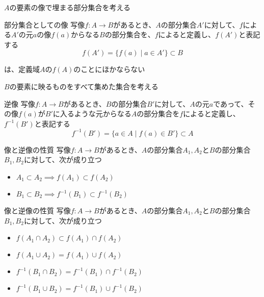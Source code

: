 \documentclass[../../../topic_mapping]{subfiles}
\begin{document}
\sectionline
{}

$A$の要素の像で埋まる部分集合を考える

\begin{definition}{部分集合としての像}
  写像$f\colon A \to B$があるとき、$A$の部分集合$A'$に対して、$f$による$A'$の元$a$の像$f(a)$からなる$B$の部分集合を、$f$によると定義し、$f(A')$と表記する
  \begin{equation*}
    f(A') = \{ f(a) \mid a \in A' \} \subset B
  \end{equation*}
\end{definition}

は、定義域$A$の$f(A)$のことにほかならない

\sectionline

$B$の要素に映るものをすべて集めた集合を考える

\begin{definition}{逆像}
  写像$f\colon A \to B$があるとき、$B$の部分集合$B'$に対して、$A$の元$a$であって、その像$f(a)$が$B'$に入るような元からなる$A$の部分集合を$f$によると定義し、$f^{-1}(B')$と表記する
  \begin{equation*}
    f^{-1}(B') = \{ a \in A \mid f(a) \in B' \} \subset A
  \end{equation*}
\end{definition}

\sectionline

\begin{theorem}{像と逆像の性質}
  写像$f\colon A \to B$があるとき、$A$の部分集合$A_1, A_2$と$B$の部分集合$B_1, B_2$に対して、次が成り立つ
  \begin{itemize}
    \item $A_1 \subset A_2 \implies f(A_1) \subset f(A_2)$
    \item $B_1 \subset B_2 \implies f^{-1}(B_1) \subset f^{-1}(B_2)$
  \end{itemize}
\end{theorem}

\begin{theorem}{像と逆像の性質}
  写像$f\colon A \to B$があるとき、$A$の部分集合$A_1, A_2$と$B$の部分集合$B_1, B_2$に対して、次が成り立つ
  \begin{itemize}
    \item $f(A_1 \cap A_2) \subset f(A_1) \cap f(A_2)$
    \item $f(A_1 \cup A_2) = f(A_1) \cup f(A_2)$
    \item $f^{-1}(B_1 \cap B_2) = f^{-1}(B_1) \cap f^{-1}(B_2)$
    \item $f^{-1}(B_1 \cup B_2) = f^{-1}(B_1) \cup f^{-1}(B_2)$
  \end{itemize}
\end{theorem}
\end{document}
